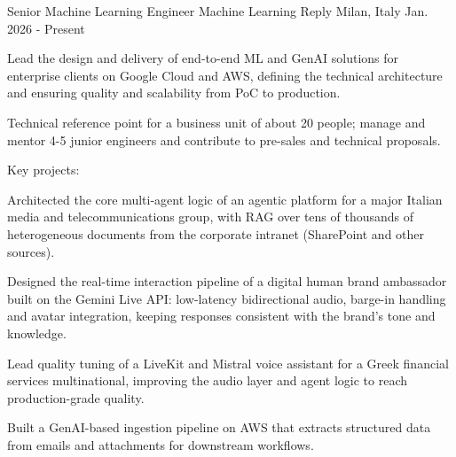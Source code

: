

\begin{cventries}

  \cventry
    {Senior Machine Learning Engineer} %
    {Machine Learning Reply} %
    {Milan, Italy} %
    {Jan. 2026 - Present} %
    {
      \begin{cvitems} %
        \item {Lead the design and delivery of end-to-end ML and GenAI solutions for enterprise clients on Google Cloud and AWS, defining the technical architecture and ensuring quality and scalability from PoC to production.}
        \item {Technical reference point for a business unit of about 20 people; manage and mentor 4-5 junior engineers and contribute to pre-sales and technical proposals.}
        \item[] {\hspace*{-\leftmargin}Key projects:}
        \item {Architected the core multi-agent logic of an agentic platform for a major Italian media and telecommunications group, with RAG over tens of thousands of heterogeneous documents from the corporate intranet (SharePoint and other sources).}
        \item {Designed the real-time interaction pipeline of a digital human brand ambassador built on the Gemini Live API: low-latency bidirectional audio, barge-in handling and avatar integration, keeping responses consistent with the brand's tone and knowledge.}
        \item {Lead quality tuning of a LiveKit and Mistral voice assistant for a Greek financial services multinational, improving the audio layer and agent logic to reach production-grade quality.}
        \item {Built a GenAI-based ingestion pipeline on AWS that extracts structured data from emails and attachments for downstream workflows.}
      \end{cvitems}
    }


\end{cventries}
